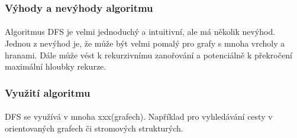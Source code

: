 \documentclass[12pt]{article}
\begin{document}
\subsubsection{Výhody a nevýhody algoritmu}
\paragraph{}
Algoritmus DFS je velmi jednoduchý a intuitivní, ale má několik nevýhod. Jednou z 
nevýhod je, že může být velmi pomalý pro grafy s mnoha vrcholy a hranami. Dále může 
vést k rekurzivnímu zanořování a potenciálně k překročení maximální hloubky rekurze.
\subsubsection{Využití algoritmu}
\paragraph{}
DFS se využívá v mnoha xxx(grafech). Například pro vyhledávání cesty v orientovaných grafech či stromových strukturých.
\end{document}
